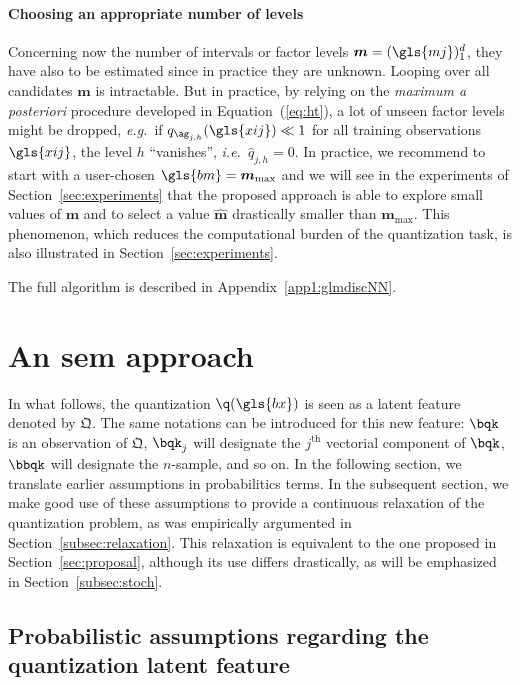  
\paragraph{Choosing an appropriate number of levels}

Concerning now the number of intervals or factor levels $\boldsymbol{m} = (\gls{mj})_1^d$, they have also to be estimated since in practice they are unknown. Looping over all candidates $\boldsymbol{m}$ is intractable. But in practice, by relying on the \textit{maximum a posteriori} procedure developed in Equation~(\ref{eq:ht}), a lot of unseen factor levels might be dropped, \textit{e.g.}\ if $q_{\ag_{j,h}}(\gls{xij}) \ll 1$ for all training observations $\gls{xij}$, the level $h$ ``vanishes'', \textit{i.e.}\ $\hat{q}_{j,h} = 0$. In practice, we recommend to start with a user-chosen $\gls{bm}=\boldsymbol{m}_{\max}$ and we will see in the experiments of Section~\ref{sec:experiments} that the proposed approach is able to explore small values of $\boldsymbol{m}$ and to select a value $\hat{\boldsymbol{m}}$ drastically smaller than $\boldsymbol{m}_{\max}$. This phenomenon, which reduces the computational burden of the quantization task, is also illustrated in Section~\ref{sec:experiments}.

The full algorithm is described in Appendix~\ref{app1:glmdiscNN}.


\section{An \gls{sem} approach} \label{sec:sem}
 
 
In what follows, the quantization $\q(\gls{bx})$ is seen as a latent feature denoted by $\bm{\mathfrak{Q}}$. The same notations can be introduced for this new feature:  $\bqk$ is an observation of $\bm{\mathfrak{Q}}$, $\bqk_j$ will designate the $j^{\text{th}}$ vectorial component of $\bqk$, $\bbqk$ will designate the $n$-sample, and so on. In the following section, we translate earlier assumptions in probabilitics terms. In the subsequent section, we make good use of these assumptions to provide a continuous relaxation of the quantization problem, as was empirically argumented in Section~\ref{subsec:relaxation}. This relaxation is equivalent to the one proposed in Section~\ref{sec:proposal}, although its use differs drastically, as will be emphasized in Section~\ref{subsec:stoch}.

\subsection{Probabilistic assumptions regarding the quantization latent feature}


